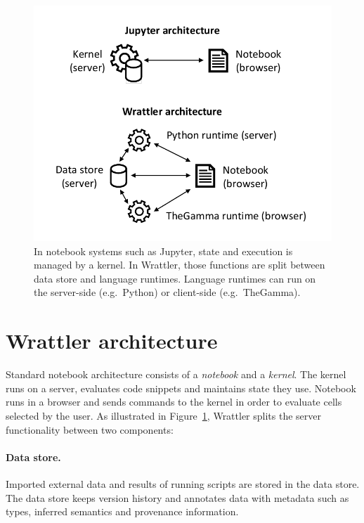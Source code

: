 \documentclass[sigplan]{acmart}\settopmatter{printfolios=true,printccs=false,printacmref=false}
\begin{document}
\begin{figure}[b]
\vspace{-2em}
\includegraphics[scale=0.6]{diagram.pdf}
\vspace{-1.5em}
\caption{\small{In notebook systems such as Jupyter, state and execution is managed by a kernel. In
  Wrattler, those functions are split between data store and language runtimes. Language runtimes 
  can run on the server-side (e.g.~Python) or client-side (e.g.~TheGamma).}}
\label{fig:arch}
\end{figure}

\section{Wrattler architecture}
\label{sec:arch}
Standard notebook architecture consists of a \emph{notebook} and a \emph{kernel}. The kernel
runs on a server, evaluates code snippets and maintains state they use.
Notebook runs in a browser and sends commands to the kernel in order to evaluate 
cells selected by the user. As illustrated in Figure~\ref{fig:arch}, Wrattler splits the 
server functionality between two components:

\paragraph{Data store.} Imported external data and results of running scripts  
are stored in the data store. The data store keeps version history and annotates data with 
metadata such as types, inferred semantics and provenance information.
\end{document}
